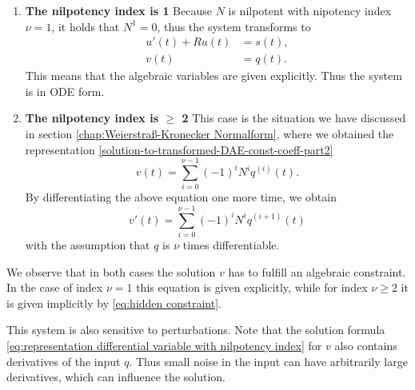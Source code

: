 \begin{enumerate}
	\item \textbf{The nilpotency index is 1} \newline
		Because $N$ is nilpotent with nipotency index $\nu = 1$, it holds that $N^1 = 0$, thus the system transforms to
		\begin{align*}
			u'(t) + Ru(t) &= s(t), \\
			v(t) &= q(t).
		\end{align*}
		This means that the algebraic variables are given explicitly. Thus the system is in ODE form.

	\item \textbf{The nilpotency index is $\geq$ 2} \newline
		This case is the situation we have discussed in section \ref{chap:Weierstraß-Kronecker Normalform}, where we obtained the representation \eqref{solution-to-transformed-DAE-const-coeff-part2}
		\begin{equation}
			\label{eq:representation differential variable with nilpotency index}
			v(t) = \sum_{i=0}^{\nu-1} (-1)^iN^iq^{(i)}(t).
		\end{equation}
		By differentiating the above equation one more time, we obtain
		\begin{equation}
			\label{eq:hidden constraint}
			v'(t) = \sum_{i=0}^{\nu-1} (-1)^iN^iq^{(i+1)}(t)
		\end{equation}
		with the assumption that $q$ is $\nu$ times differentiable.
\end{enumerate}

We observe that in both cases the solution $v$ has to fulfill an algebraic constraint. In the case of index $\nu = 1$ this equation is given explicitly, while for index $\nu \geq 2$ it is given implicitly by \eqref{eq:hidden constraint}.

This system is also sensitive to perturbations. Note that the solution formula \eqref{eq:representation differential variable with nilpotency index} for $v$ also contains derivatives of the input $q$. Thus small noise in the input can have arbitrarily large derivatives, which can influence the solution.



